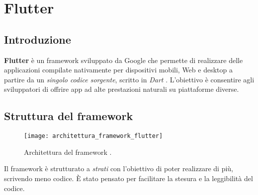 \chapter{Flutter}
\section{Introduzione}
\textbf{Flutter} è un framework sviluppato da Google che permette di realizzare delle applicazioni compilate nativamente per dispositivi mobili, Web e desktop a partire da un \textit{singolo codice sorgente}, scritto in \textit{Dart} \cite{flutter}. L'obiettivo è consentire agli sviluppatori di offrire app ad alte prestazioni naturali su piattaforme diverse.

\section{Struttura del framework}
\begin{figure}
	\begin{center}
		\texttt{[image: architettura\_framework\_flutter]}
		\caption[Architettura del framework Flutter]{Architettura del framework \cite{flutter_technical_overview}.}
		\label{figura:architettura_framework_flutter}
	\end{center}
\end{figure}

Il framework è strutturato a \textit{strati} con l'obiettivo di poter realizzare di più, scrivendo meno codice. È stato pensato per facilitare la stesura e la leggibilità del codice. 

